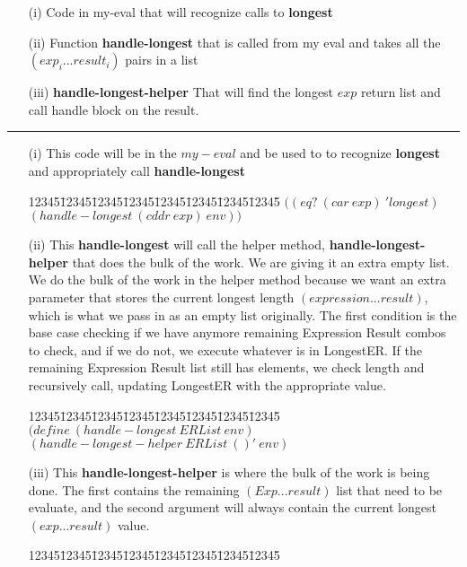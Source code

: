 \documentclass[11pt]{article}
\newenvironment{code}{\begin{tabbing}
12345\=12345\=12345\=12345\=12345\=12345\=12345\=12345\= \kill }
{\end{tabbing}}
\begin{document}
\begin{enumerate}
\begin{enumerate}
\begin{itemize}


\item[(i)] Code in my-eval that will recognize calls to \textbf{longest}\\
\item[(ii)] Function \textbf{handle-longest} that is called from my eval and takes all the $(exp_i...result_i)$ pairs in a list\\
\item[(iii)] \textbf{handle-longest-helper} That will find the longest $exp$ return list and call handle block on the result. 
\end{itemize}
\noindent\rule{15cm}{0.4pt}
\begin{enumerate}

\item[(i)]
This code will be in the $my-eval$ and be used to to recognize \textbf{longest} and appropriately call \textbf{handle-longest}
\begin{code}
$((eq?\ (car\ exp)\ 'longest)$\\
\>$(handle-longest\ (cddr\ exp)\ env))$\\
\end{code}
\item[(ii)]
This \textbf{handle-longest} will call the helper method, \textbf{handle-longest-helper} that does the bulk of the work.  We are giving it an extra empty list.  We do the bulk of the work in the helper method because we want an extra parameter that stores the current longest length $(expression...result)$, which is what we pass in as an empty list originally.  The first condition is the base case checking if we have anymore remaining Expression Result combos to check, and if we do not, we execute whatever is in LongestER.  If the remaining Expression Result list still has elements, we check length and recursively call, updating LongestER with the appropriate value.
\begin{code}
$(define\ (handle-longest\ ERList\ env)$\\
\> $(handle-longest-helper\ ERList\ ()'\ env)$\\
\end{code}
\item[(iii)]
This \textbf{handle-longest-helper} is where the bulk of the work is being done.  The first contains the remaining $(Exp...result)$ list that need to be evaluate, and the second argument will always contain the current longest $(exp...result)$ value. 
\begin{code}

\end{code}
\end{enumerate}
\end{enumerate}
\end{enumerate}
\end{document}
